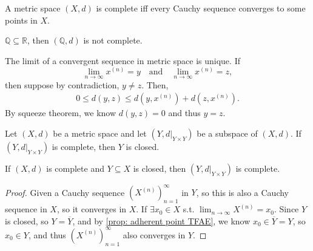 \begin{definition}
    A metric space \((X, d)\) is complete iff every Cauchy sequence converges to some points in \(X\). 
\end{definition}

\begin{remark}
    \( \mathbb{Q} \subseteq \mathbb{R} \), then \((\mathbb{Q} ,d)\) is not complete. 
\end{remark}

\begin{remark}
    The limit of a convergent sequence in metric space is unique. If 
    \[
        \lim_{n \to \infty} x^{(n)} = y \quad \text{and} \quad \lim_{n \to \infty} x^{(n)} = z,
    \] then suppose by contradiction, \(y \neq z\). Then, 
    \begin{align*}
        0 \le d(y, z) \le d\left( y, x^{(n)} \right) + d\left( z, x^{(n)} \right) .
    \end{align*} 
    By squeeze theorem, we know \(d(y, z) = 0\) and thus \(y = z\).  
\end{remark}

\begin{proposition}
    Let \((X, d)\) be a metric space and let \(\left( Y, d\vert_{Y \times Y} \right) \) be a subspace of \((X, d)\). If \(\left( Y, d\vert_{Y \times Y} \right) \) is complete, then \(Y\) is closed.
\end{proposition}

\begin{proposition}
    If \((X, d)\) is complete and \(Y \subseteq X\) is closed, then \(\left( Y, d\vert_{Y \times Y} \right) \) is complete.   
\end{proposition}
\begin{proof}
    Given a Cauchy sequence \(\left( X^{(n)} \right)_{n=1}^{\infty}  \) in \(Y\), so this is also a Cauchy sequence in \(X\), so it converges in \(X\). If \(\exists x_0 \in X\) s.t. \(\lim_{n \to \infty} X^{(n)} = x_0 \). Since \(Y\) is closed, so \(Y = \overline{Y} \), and by \autoref{prop: adherent point TFAE}, we know \(x_0 \in \overline{Y} = Y \), so \(x_0 \in Y\), and thus \(\left( X^{(n)} \right)_{n=1}^{\infty }\) also converges in \(Y\).         
\end{proof}